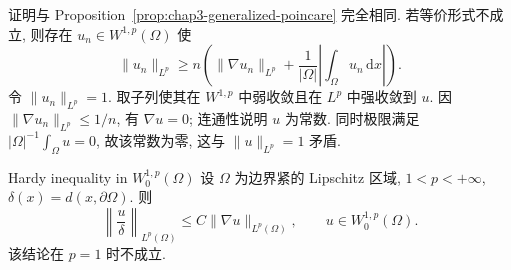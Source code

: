 \begin{Proof}
证明与 Proposition~\ref{prop:chap3-generalized-poincare} 完全相同. 若等价形式不成立, 则存在 $u_n\in W^{1,p}(\Omega)$ 使
\[
 \|u_n\|_{L^p}\geq n\left(\|\nabla u_n\|_{L^p}
 +\frac1{|\Omega|}\left|\int_\Omega u_n\,\mathrm dx\right|\right).
\]
令 $\|u_n\|_{L^p}=1$. 取子列使其在 $W^{1,p}$ 中弱收敛且在 $L^p$ 中强收敛到 $u$. 因 $\|\nabla u_n\|_{L^p}\leq1/n$, 有 $\nabla u=0$; 连通性说明 $u$ 为常数. 同时极限满足 $|\Omega|^{-1}\int_\Omega u=0$, 故该常数为零, 这与 $\|u\|_{L^p}=1$ 矛盾.
\end{Proof}

\begin{Proposition}{Hardy inequality in $W_0^{1,p}(\Omega)$}
\label{prop:chap3-hardy-boundary-distance}
设 $\Omega$ 为边界紧的 Lipschitz 区域, $1<p<+\infty$, $\delta(x)=d(x,\partial\Omega)$. 则
\[
 \left\|\frac u\delta\right\|_{L^p(\Omega)}\leq C\|\nabla u\|_{L^p(\Omega)},
 \qquad u\in W_0^{1,p}(\Omega).
\]
该结论在 $p=1$ 时不成立.
\end{Proposition}

